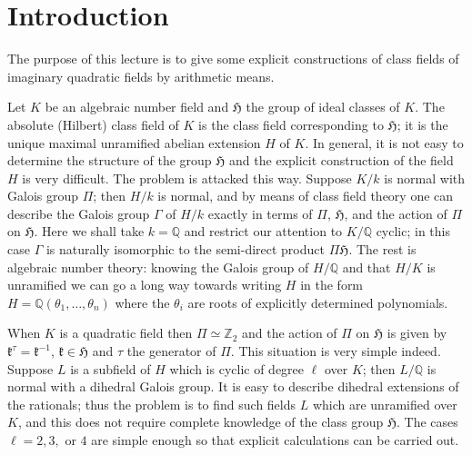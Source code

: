 
\setcounter{section}{-1}

\section{Introduction}\label{sec:VII-intro}

The purpose of this lecture is to give some explicit constructions of
class fields of imaginary quadratic fields by arithmetic means.

Let $K$ be an algebraic number field and $\mathfrak{H}$ the group of
ideal classes of $K$. The absolute (Hilbert) class field of $K$ is the
class field corresponding to $\mathfrak{H}$; it is the unique maximal
unramified abelian extension $H$ of $K$. In general, it is not easy to
determine the structure of the group $\mathfrak{H}$ and the explicit
construction of the field $H$ is very difficult. The problem is attacked
this way. Suppose $K/k$ is normal with Galois group $\Pi$; then $H/k$ is
normal, and by means of class field theory one can describe the Galois
group $\Gamma$ of $H/k$ exactly in terms of $\Pi$, $\mathfrak{H}$, and
the action of $\Pi$ on $\mathfrak{H}$. Here we shall take $k=\mathbb{Q}$
and restrict our attention to $K/\mathbb{Q}$ cyclic; in this case $\Gamma$
is naturally isomorphic to the semi-direct product $\Pi\mathfrak{H}$. The
rest is algebraic number theory: knowing the Galois group of
$H/\mathbb{Q}$ and that $H/K$ is unramified we can go a long way towards
writing $H$ in the form $H=\mathbb{Q}(\theta_{1},\ldots,\theta_{n})$
where the $\theta_{i}$ are roots of explicitly determined polynomials.

When $K$ is a quadratic field then $\Pi\simeq\mathbb{Z}_{2}$ and the
action of $\Pi$ on $\mathfrak{H}$ is given by
$\mathfrak{k}^{\tau}=\mathfrak{k}^{-1}$,
$\mathfrak{k}\in\mathfrak{H}$ and $\tau$ the generator of $\Pi$. This
situation is very simple indeed. Suppose $L$ is a subfield of $H$ which
is cyclic of degree $\ell$ over $K$; then $L/\mathbb{Q}$ is normal with a
dihedral Galois group. It is easy to describe dihedral extensions of the
rationals; thus the problem is to find such fields $L$ which are
unramified over $K$, and this does not require complete knowledge of the
class group $\mathfrak{H}$. The cases $\ell=2,3,$ or $4$ are simple
enough so that explicit calculations can be carried out.


